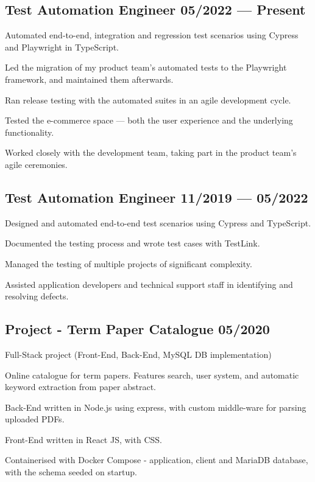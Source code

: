 \documentclass[letter,10pt]{article}
\begin{document}
\subsection{{Test Automation Engineer \hfill 05/2022 --- Present}}
\begin{zitemize}
\item Automated end-to-end, integration and regression test scenarios using Cypress and Playwright in TypeScript.
\item Led the migration of my product team's automated tests to the Playwright framework, and maintained them afterwards.
\item Ran release testing with the automated suites in an agile development cycle.
\item Tested the e-commerce space --- both the user experience and the underlying functionality.
\item Worked closely with the development team, taking part in the product team's agile ceremonies.
\end{zitemize}

\subsection{{Test Automation Engineer \hfill 11/2019 --- 05/2022}}
\begin{zitemize}
\item Designed and automated end-to-end test scenarios using Cypress and TypeScript.
\item Documented the testing process and wrote test cases with TestLink.
\item Managed the testing of multiple projects of significant complexity.
\item Assisted application developers and technical support staff in identifying and resolving defects.
\end{zitemize}

\subsection{{Project - Term Paper Catalogue \hfill 05/2020}}
\begin{zitemize}
\item Full-Stack project (Front-End, Back-End, MySQL DB implementation)
\item Online catalogue for term papers. Features search, user system, and automatic keyword extraction from paper abstract.
\item Back-End written in Node.js using express, with custom middle-ware for parsing uploaded PDFs.
\item Front-End written in React JS, with CSS.
\item Containerised with Docker Compose - application, client and MariaDB database, with the schema seeded on startup.
\end{zitemize}
\end{document}
